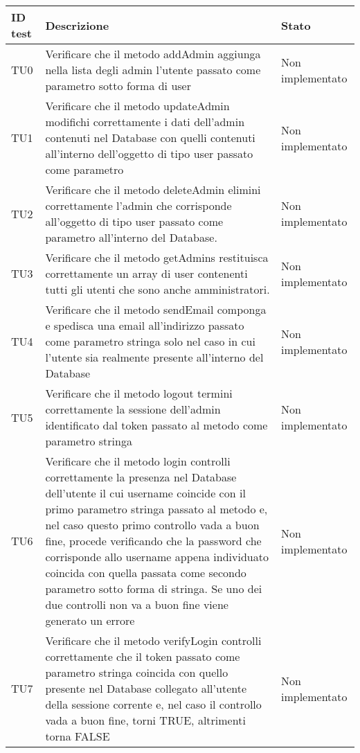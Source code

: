 \documentclass[../PianoDiQualifica.tex]{subfiles}
\begin{document}
	\begin{longtable}[c] { >{\centering\arraybackslash}p{4cm} p{7cm} >{\centering\arraybackslash}p{4cm}}
		\toprule
		\centerline{\textbf{ID test}} & \centerline{\textbf{Descrizione}} & \centerline{\textbf{Stato}} \\
			\midrule
			TU0 & Verificare che il metodo addAdmin aggiunga nella lista degli admin l'utente passato come parametro sotto forma di user & Non implementato \\ 
			\addlinespace[0.3em]
			\midrule
			\addlinespace[0.3em]
TU1 & Verificare che il metodo updateAdmin modifichi correttamente i dati dell'admin contenuti nel Database con quelli contenuti all'interno dell'oggetto di tipo user passato come parametro & Non implementato \\
			\addlinespace[0.3em]
			\midrule
			\addlinespace[0.3em]
			TU2 & Verificare che il metodo deleteAdmin elimini correttamente l'admin che corrisponde all'oggetto di tipo user passato come parametro all'interno del Database. & Non implementato \\
			\addlinespace[0.3em]
			\midrule
			\addlinespace[0.3em]
			TU3 & Verificare che il metodo getAdmins restituisca correttamente un array di user contenenti tutti gli utenti che sono anche amministratori. & Non implementato \\ 
			\addlinespace[0.3em]
			\midrule
			\addlinespace[0.3em]
			TU4 & Verificare che il metodo sendEmail componga e spedisca una email all'indirizzo passato come parametro stringa solo nel caso in cui l'utente sia realmente presente all'interno del Database & Non implementato \\
			\addlinespace[0.3em]
			\midrule
			\addlinespace[0.3em]
			TU5 & Verificare che il metodo logout termini correttamente la sessione dell'admin identificato dal token passato al metodo come parametro stringa & Non implementato \\
			\addlinespace[0.3em]
			\midrule
			\addlinespace[0.3em]
			TU6 & Verificare che il metodo login controlli correttamente la presenza nel Database dell'utente il cui username coincide con il primo parametro stringa passato al metodo e, nel caso questo primo controllo vada a buon fine, procede verificando che la password che corrisponde allo username appena individuato coincida con quella passata come secondo parametro sotto forma di stringa. Se uno dei due controlli non va a buon fine viene generato un errore & Non implementato \\
			\addlinespace[0.3em]
			\midrule
			\addlinespace[0.3em] 
			TU7 & Verificare che il metodo verifyLogin controlli correttamente che il token passato come parametro stringa coincida con quello presente nel Database collegato all'utente della sessione corrente e, nel caso il controllo vada a buon fine, torni TRUE, altrimenti torna FALSE & Non implementato \\

\end{longtable}
\end{document}
